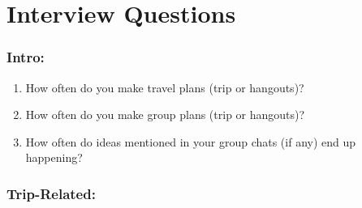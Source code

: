 \documentclass[12pt,a4paper]{article}
\begin{document}
\appendix
\section{Interview Questions}
\label{app:questions}

\subsubsection*{Intro: }

\begin{enumerate}
    \item How often do you make travel plans (trip or hangouts)? 
    \item How often do you make group plans (trip or hangouts)?
    \item How often do ideas mentioned in your group chats (if any) end up happening?
\end{enumerate}

\subsubsection*{Trip-Related: }
\end{document}
